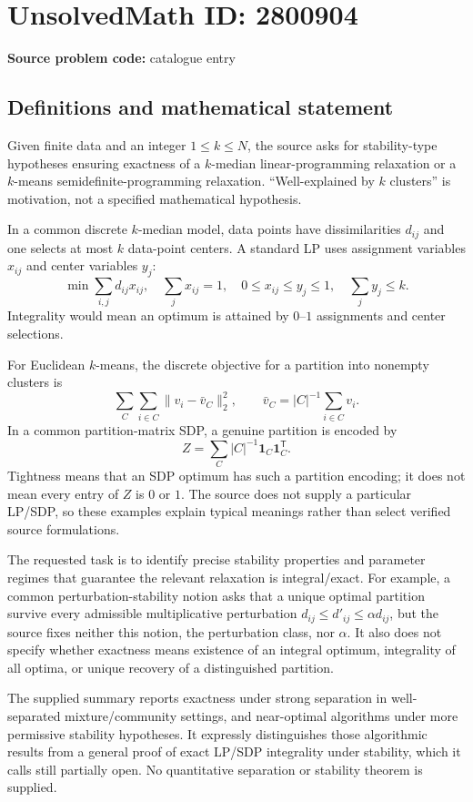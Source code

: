 \documentclass[11pt]{article}
\begin{document}
\section*{UnsolvedMath ID: 2800904}
\textbf{Source problem code:} catalogue entry
\subsection{Definitions and mathematical statement}
Given finite data and an integer $1\leq k\leq N$, the source asks for stability-type hypotheses ensuring exactness of a $k$-median linear-programming relaxation or a $k$-means semidefinite-programming relaxation. ``Well-explained by $k$ clusters'' is motivation, not a specified mathematical hypothesis.

In a common discrete $k$-median model, data points have dissimilarities $d_{ij}$ and one selects at most $k$ data-point centers. A standard LP uses assignment variables $x_{ij}$ and center variables $y_j$:
\[
\min\sum_{i,j}d_{ij}x_{ij},\quad
\sum_jx_{ij}=1,\quad0\leq x_{ij}\leq y_j\leq1,\quad
\sum_jy_j\leq k.
\]
Integrality would mean an optimum is attained by $0$--$1$ assignments and center selections.

For Euclidean $k$-means, the discrete objective for a partition into nonempty clusters is
\[
\sum_{C}\sum_{i\in C}\|v_i-\bar v_C\|_2^2,
\qquad \bar v_C=|C|^{-1}\sum_{i\in C}v_i.
\]
In a common partition-matrix SDP, a genuine partition is encoded by
\[
Z=\sum_C|C|^{-1}\mathbf1_C\mathbf1_C^{\mathsf T}.
\]
Tightness means that an SDP optimum has such a partition encoding; it does not mean every entry of $Z$ is $0$ or $1$. The source does not supply a particular LP/SDP, so these examples explain typical meanings rather than select verified source formulations.

The requested task is to identify precise stability properties and parameter regimes that guarantee the relevant relaxation is integral/exact. For example, a common perturbation-stability notion asks that a unique optimal partition survive every admissible multiplicative perturbation $d_{ij}\leq d'_{ij}\leq\alpha d_{ij}$, but the source fixes neither this notion, the perturbation class, nor $\alpha$. It also does not specify whether exactness means existence of an integral optimum, integrality of all optima, or unique recovery of a distinguished partition.

The supplied summary reports exactness under strong separation in well-separated mixture/community settings, and near-optimal algorithms under more permissive stability hypotheses. It expressly distinguishes those algorithmic results from a general proof of exact LP/SDP integrality under stability, which it calls still partially open. No quantitative separation or stability theorem is supplied.
\end{document}
